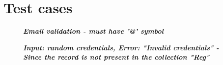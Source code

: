 \section{Test cases}
\begin{figure}[htp]
    \centering
    \caption{\textbf{\textit{Email validation - must have '@' symbol}}}
    \label{fig:test-case-invalid-creds}
\end{figure}
\begin{figure}[htp]
    \centering
    \caption{\textbf{\textit{Input: random credentials, Error: "Invalid credentials" - Since the record is not present in the collection "Reg"}}}
    \label{fig:test-case-invalid-creds}
\end{figure}
